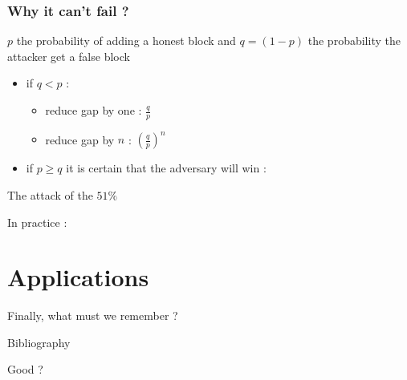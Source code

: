 \documentclass[12pt]{beamer}
\begin{document}
\begin{frame}
\frametitle{Why it can't fail ?}
$p$ the probability of adding a honest block and $q = (1-p)$ the probability the attacker get a false block
\begin{itemize}
\item if $q < p$ :
\begin{itemize}
\item reduce gap by one : $\frac{q}{p}$
\item reduce gap by $n$ : $\left (\frac{q}{p}\right )^n$
\end{itemize}
\item if $p \ge q$ it is certain that the adversary will win : 
\end{itemize}
\begin{center}
\color{red!50!black} \large The attack of the $51\%$
\end{center}

In practice :

\end{frame}

\section{Applications}

\begin{frame}
Finally, what must we remember ? %
\end{frame}

\begin{frame}
Bibliography %
\end{frame}

\begin{frame}


Good ?

\end{frame}
\end{document}
